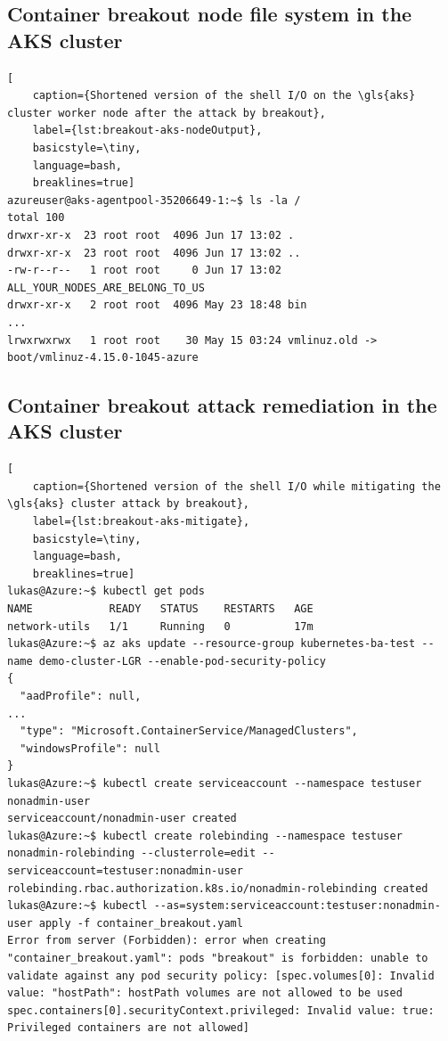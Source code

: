 \subsection{Container breakout node file system in the AKS cluster}

\begin{lstlisting}[
	caption={Shortened version of the shell I/O on the \gls{aks} cluster worker node after the attack by breakout},
	label={lst:breakout-aks-nodeOutput},
	basicstyle=\tiny,
	language=bash,
	breaklines=true]
azureuser@aks-agentpool-35206649-1:~$ ls -la /
total 100
drwxr-xr-x  23 root root  4096 Jun 17 13:02 .
drwxr-xr-x  23 root root  4096 Jun 17 13:02 ..
-rw-r--r--   1 root root     0 Jun 17 13:02 ALL_YOUR_NODES_ARE_BELONG_TO_US
drwxr-xr-x   2 root root  4096 May 23 18:48 bin
...
lrwxrwxrwx   1 root root    30 May 15 03:24 vmlinuz.old -> boot/vmlinuz-4.15.0-1045-azure
\end{lstlisting}

\subsection{Container breakout attack remediation in the AKS cluster}
\begin{lstlisting}[
	caption={Shortened version of the shell I/O while mitigating the \gls{aks} cluster attack by breakout},
	label={lst:breakout-aks-mitigate},
	basicstyle=\tiny,
	language=bash,
	breaklines=true]
lukas@Azure:~$ kubectl get pods
NAME            READY   STATUS    RESTARTS   AGE
network-utils   1/1     Running   0          17m
lukas@Azure:~$ az aks update --resource-group kubernetes-ba-test --name demo-cluster-LGR --enable-pod-security-policy
{
  "aadProfile": null,
...
  "type": "Microsoft.ContainerService/ManagedClusters",
  "windowsProfile": null
}
lukas@Azure:~$ kubectl create serviceaccount --namespace testuser nonadmin-user
serviceaccount/nonadmin-user created
lukas@Azure:~$ kubectl create rolebinding --namespace testuser nonadmin-rolebinding --clusterrole=edit --serviceaccount=testuser:nonadmin-user
rolebinding.rbac.authorization.k8s.io/nonadmin-rolebinding created
lukas@Azure:~$ kubectl --as=system:serviceaccount:testuser:nonadmin-user apply -f container_breakout.yaml
Error from server (Forbidden): error when creating "container_breakout.yaml": pods "breakout" is forbidden: unable to validate against any pod security policy: [spec.volumes[0]: Invalid value: "hostPath": hostPath volumes are not allowed to be used spec.containers[0].securityContext.privileged: Invalid value: true: Privileged containers are not allowed]
\end{lstlisting}